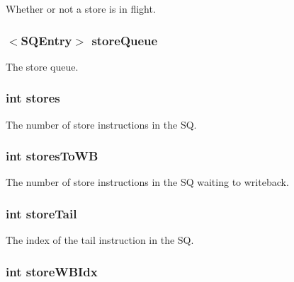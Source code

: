\label{classLSQUnit_aec79dbfe7cf50cf3d047cad7ee8fa157}
Whether or not a store is in flight. \hypertarget{classLSQUnit_a1d370cdc36d253e0f786d46c6af77a40}{
\subsubsection[{storeQueue}]{$<${\bf SQEntry}$>$ {\bf storeQueue}}}
\label{classLSQUnit_a1d370cdc36d253e0f786d46c6af77a40}
The store queue. \hypertarget{classLSQUnit_ade9e895aa9c5ace27779c985c4f43326}{
\subsubsection[{stores}]{\setlength{\rightskip}{0pt plus 5cm}int {\bf stores}}}
\label{classLSQUnit_ade9e895aa9c5ace27779c985c4f43326}
The number of store instructions in the SQ. \hypertarget{classLSQUnit_a3831a7965ffbe90df177026988476f9c}{
\subsubsection[{storesToWB}]{\setlength{\rightskip}{0pt plus 5cm}int {\bf storesToWB}}}
\label{classLSQUnit_a3831a7965ffbe90df177026988476f9c}
The number of store instructions in the SQ waiting to writeback. \hypertarget{classLSQUnit_acd5c7fbb5578b5cb505ffff16bbf6a8b}{
\subsubsection[{storeTail}]{\setlength{\rightskip}{0pt plus 5cm}int {\bf storeTail}}}
\label{classLSQUnit_acd5c7fbb5578b5cb505ffff16bbf6a8b}
The index of the tail instruction in the SQ. \hypertarget{classLSQUnit_a9023e0813d4f3e566d17fb6334a2da02}{
\subsubsection[{storeWBIdx}]{\setlength{\rightskip}{0pt plus 5cm}int {\bf storeWBIdx}}}
